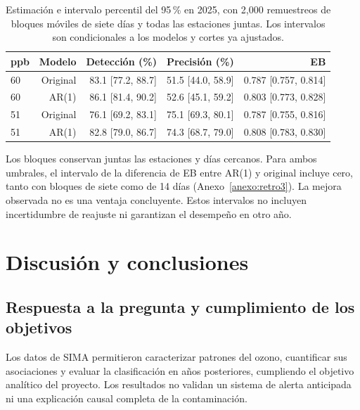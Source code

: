 \documentclass[11pt,letterpaper]{article}
\newenvironment{cambio}{}{}
\begin{document}
\begin{table}[H]
\begin{cambio}\centering\small
\begin{tabular}{@{}lrrrr@{}}\toprule
ppb & Modelo & Detección (\%) & Precisión (\%) & EB\\\midrule
60 & Original & 83.1 [77.2, 88.7] & 51.5 [44.0, 58.9] & 0.787 [0.757, 0.814]\\
60 & AR(1) & 86.1 [81.4, 90.2] & 52.6 [45.1, 59.2] & 0.803 [0.773, 0.828]\\
51 & Original & 76.1 [69.2, 83.1] & 75.1 [69.3, 80.1] & 0.787 [0.755, 0.816]\\
51 & AR(1) & 82.8 [79.0, 86.7] & 74.3 [68.7, 79.0] & 0.808 [0.783, 0.830]\\
\bottomrule\end{tabular}
\caption{Estimación e intervalo percentil del 95\,\% en 2025, con 2,000 remuestreos de bloques móviles de siete días y todas las estaciones juntas. Los intervalos son condicionales a los modelos y cortes ya ajustados.}\label{tab:intervalos_semanales}
\end{cambio}
\end{table}
\begin{cambio}
Los bloques conservan juntas las estaciones y días cercanos. Para ambos umbrales, el intervalo de la diferencia de EB entre AR(1) y original incluye cero, tanto con bloques de siete como de 14 días (Anexo~\ref{anexo:retro3}). La mejora observada no es una ventaja concluyente. Estos intervalos no incluyen incertidumbre de reajuste ni garantizan el desempeño en otro año.
\end{cambio}
\clearpage

\section{Discusión y conclusiones}
\subsection{Respuesta a la pregunta y cumplimiento de los objetivos}

\begin{cambio}
Los datos de SIMA permitieron caracterizar patrones del ozono, cuantificar sus asociaciones y evaluar la clasificación en años posteriores, cumpliendo el objetivo analítico del proyecto. Los resultados no validan un sistema de alerta anticipada ni una explicación causal completa de la contaminación.
\end{cambio}
\end{document}
